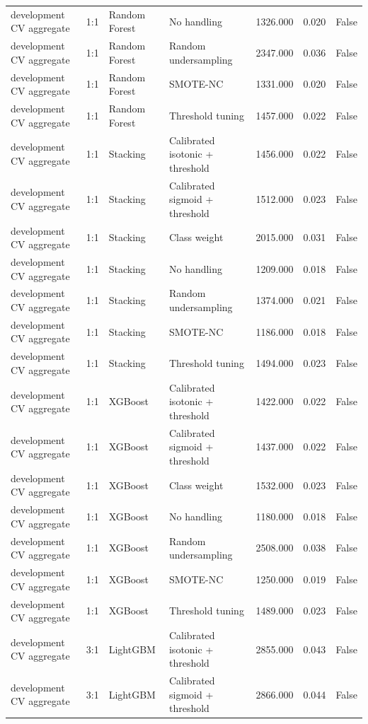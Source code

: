 \begin{tabular}{llllrrr}
development CV aggregate & 1:1 & Random Forest & No handling & 1326.000 & 0.020 & False \\
development CV aggregate & 1:1 & Random Forest & Random undersampling & 2347.000 & 0.036 & False \\
development CV aggregate & 1:1 & Random Forest & SMOTE-NC & 1331.000 & 0.020 & False \\
development CV aggregate & 1:1 & Random Forest & Threshold tuning & 1457.000 & 0.022 & False \\
development CV aggregate & 1:1 & Stacking & Calibrated isotonic + threshold & 1456.000 & 0.022 & False \\
development CV aggregate & 1:1 & Stacking & Calibrated sigmoid + threshold & 1512.000 & 0.023 & False \\
development CV aggregate & 1:1 & Stacking & Class weight & 2015.000 & 0.031 & False \\
development CV aggregate & 1:1 & Stacking & No handling & 1209.000 & 0.018 & False \\
development CV aggregate & 1:1 & Stacking & Random undersampling & 1374.000 & 0.021 & False \\
development CV aggregate & 1:1 & Stacking & SMOTE-NC & 1186.000 & 0.018 & False \\
development CV aggregate & 1:1 & Stacking & Threshold tuning & 1494.000 & 0.023 & False \\
development CV aggregate & 1:1 & XGBoost & Calibrated isotonic + threshold & 1422.000 & 0.022 & False \\
development CV aggregate & 1:1 & XGBoost & Calibrated sigmoid + threshold & 1437.000 & 0.022 & False \\
development CV aggregate & 1:1 & XGBoost & Class weight & 1532.000 & 0.023 & False \\
development CV aggregate & 1:1 & XGBoost & No handling & 1180.000 & 0.018 & False \\
development CV aggregate & 1:1 & XGBoost & Random undersampling & 2508.000 & 0.038 & False \\
development CV aggregate & 1:1 & XGBoost & SMOTE-NC & 1250.000 & 0.019 & False \\
development CV aggregate & 1:1 & XGBoost & Threshold tuning & 1489.000 & 0.023 & False \\
development CV aggregate & 3:1 & LightGBM & Calibrated isotonic + threshold & 2855.000 & 0.043 & False \\
development CV aggregate & 3:1 & LightGBM & Calibrated sigmoid + threshold & 2866.000 & 0.044 & False \\

\end{tabular}
